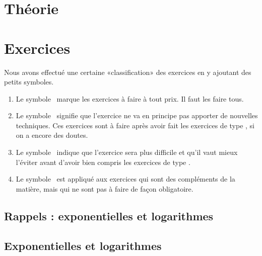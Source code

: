 







\newpage

\tableofcontents

\chapter{Théorie}



\chapter{Exercices}

Nous avons effectué une certaine «classification» des exercices en y ajoutant des petits symboles.
\begin{enumerate}
	\item Le symbole \minsyndical\ marque les exercices à faire à tout prix. Il faut les faire tous.
	\item Le symbole \boringexo\ signifie que l'exercice ne va en principe pas apporter de nouvelles techniques. Ces exercices sont à faire après avoir fait les exercices de type \minsyndical, si on a encore des doutes.
	\item Le symbole \coolexo\ indique que l'exercice sera plus difficile et qu'il vaut mieux l'éviter avant d'avoir bien compris les exercices de type \minsyndical.
	\item Le symbole \mortelexo\ est appliqué aux exercices qui sont des compléments de la matière, mais qui ne sont pas à faire de façon obligatoire.
\end{enumerate}

\section{Rappels : exponentielles et logarithmes}



\section{Exponentielles et logarithmes}



